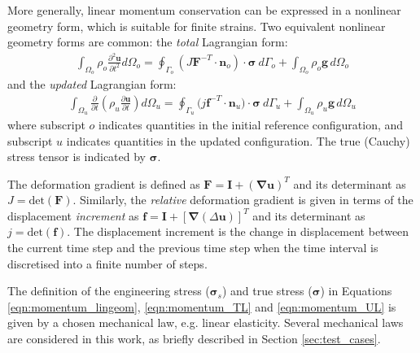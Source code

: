 \documentclass[sn-mathphys,Numbered]{sn-jnl}%
\newcommand{\bb}{\boldsymbol}
\begin{document}
More generally,  linear momentum conservation can be expressed in a nonlinear geometry form, which is suitable for finite strains.
Two equivalent nonlinear geometry forms are common: the \emph{total} Lagrangian form:
\begin{eqnarray} \label{eqn:momentum_TL}
    \int_{\Omega_o} \rho_o \frac{\partial^2 \bb{u} }{\partial t^2} d\Omega_o
    =
    \oint_{\Gamma_o} \left( J \bb{F}^{-T} \cdot \bb{n}_o \right) \cdot \bb{\sigma} \ d\Gamma_o
    + \int_{\Omega_o}  \rho_o \bb{g} \, d\Omega_o
\end{eqnarray}
and the \emph{updated} Lagrangian form:
\begin{eqnarray} \label{eqn:momentum_UL}
    \int_{\Omega_u} \frac{\partial }{\partial t} \left( \rho_u \frac{\partial \bb{u} }{\partial t} \right) d\Omega_u
    = \oint_{\Gamma_u}(j\bb{f}^{-T}\cdot{\bb{n}_u)\cdot \bb{\sigma}}\ d\Gamma_u
    + \int_{\Omega_u}  \rho_u \bb{g} \, d\Omega_u
\end{eqnarray}
where subscript $o$ indicates quantities in the initial reference configuration, and subscript $u$ indicates quantities in the updated configuration.
The true (Cauchy) stress tensor is indicated by $\bb{\sigma}$.

The deformation gradient is defined as $\bb{F} = \textbf{I} + (\bb{\nabla} \bb{u})^T$ and its determinant as $J = \text{det}(\bb{F})$.
Similarly, the \emph{relative} deformation gradient is given in terms of the displacement \emph{increment} as $\bb{f}=\textbf{I} + \left[\bb{\nabla}(\Delta \bb{u}) \right]^T$ and its determinant as $j = \text{det}(\bb{f})$.
The displacement increment is the change in displacement between the current time step and the previous time step when the time interval is discretised into a finite number of steps.




The definition of the engineering stress ($\bb{\sigma}_s$) and true stress ($\bb{\sigma}$) in Equations \ref{eqn:momentum_lingeom}, \ref{eqn:momentum_TL} and \ref{eqn:momentum_UL} is given by a chosen mechanical law, e.g. linear elasticity.
Several mechanical laws are considered in this work, as briefly described in Section \ref{sec:test_cases}.
\end{document}
